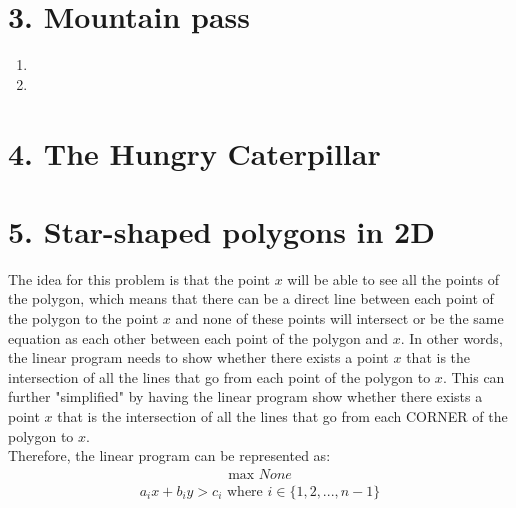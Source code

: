 \documentclass[11pt]{article}
\begin{document}
\newpage
\section*{3. Mountain pass}
\begin{enumerate}[label=(\alph*)]
\item




\item






\end{enumerate}



\newpage
\section*{4. The Hungry Caterpillar}




\newpage
\section*{5. Star-shaped polygons in 2D}
The idea for this problem is that the point $x$ will be able to see all the points of the polygon, which means that there can be a direct line between each point of the polygon to the point $x$ and none of these points will intersect or be the same equation as each other between each point of the polygon and $x$. In other words, the linear program needs to show whether there exists a point $x$ that is the intersection of all the lines that go from each point of the polygon to $x$. This can further "simplified" by having the linear program show whether there exists a point $x$ that is the intersection of all the lines that go from each CORNER of the polygon to $x$. \\
\vspace*{1\baselineskip}
Therefore, the linear program can be represented as:
\begin{align*}
\text{max } None
\end{align*}
\begin{align*}
a_i x + b_i y > c_i \text{ where } i \in \{1, 2, ..., n - 1\}
\end{align*}



\newpage
\end{document}
